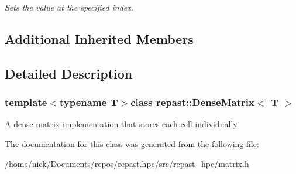 \begin{DoxyCompactItemize}
\begin{DoxyCompactList}\small\item\em Sets the value at the specified index. \end{DoxyCompactList}\end{DoxyCompactItemize}
\subsection*{Additional Inherited Members}


\subsection{Detailed Description}
\subsubsection*{template$<$typename T$>$class repast\-::\-Dense\-Matrix$<$ T $>$}

A dense matrix implementation that stores each cell individually. 

The documentation for this class was generated from the following file\-:\begin{DoxyCompactItemize}
\item 
/home/nick/\-Documents/repos/repast.\-hpc/src/repast\-\_\-hpc/matrix.\-h\end{DoxyCompactItemize}
